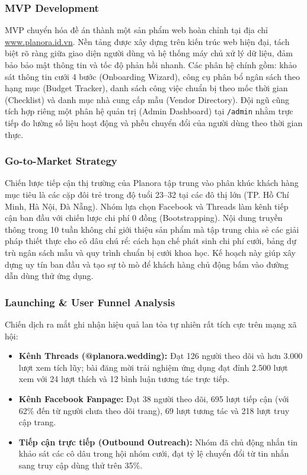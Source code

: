 \documentclass[11pt]{article}
\begin{document}
\subsubsection*{MVP Development}
MVP chuyển hóa đề án thành một sản phẩm web hoàn chỉnh tại địa chỉ \href{https://www.planora.id.vn}{www.planora.id.vn}. Nền tảng được xây dựng trên kiến trúc web hiện đại, tách biệt rõ ràng giữa giao diện người dùng và hệ thống máy chủ xử lý dữ liệu, đảm bảo bảo mật thông tin và tốc độ phản hồi nhanh. Các phân hệ chính gồm: khảo sát thông tin cưới 4 bước (Onboarding Wizard), công cụ phân bổ ngân sách theo hạng mục (Budget Tracker), danh sách công việc chuẩn bị theo mốc thời gian (Checklist) và danh mục nhà cung cấp mẫu (Vendor Directory). Đội ngũ cũng tích hợp riêng một phân hệ quản trị (Admin Dashboard) tại \texttt{/admin} nhằm trực tiếp đo lường số liệu hoạt động và phễu chuyển đổi của người dùng theo thời gian thực.

\subsubsection*{Go-to-Market Strategy}
Chiến lược tiếp cận thị trường của Planora tập trung vào phân khúc khách hàng mục tiêu là các cặp đôi trẻ trong độ tuổi 23--32 tại các đô thị lớn (TP. Hồ Chí Minh, Hà Nội, Đà Nẵng). Nhóm lựa chọn Facebook và Threads làm kênh tiếp cận ban đầu với chiến lược chi phí 0 đồng (Bootstrapping). Nội dung truyền thông trong 10 tuần không chỉ giới thiệu sản phẩm mà tập trung chia sẻ các giải pháp thiết thực cho cô dâu chú rể: cách hạn chế phát sinh chi phí cưới, bảng dự trù ngân sách mẫu và quy trình chuẩn bị cưới khoa học. Kế hoạch này giúp xây dựng uy tín ban đầu và tạo sự tò mò để khách hàng chủ động bấm vào đường dẫn dùng thử ứng dụng.

\subsubsection*{Launching \& User Funnel Analysis}
Chiến dịch ra mắt ghi nhận hiệu quả lan tỏa tự nhiên rất tích cực trên mạng xã hội:
\begin{itemize}
    \item \textbf{Kênh Threads (@planora.wedding):} Đạt 126 người theo dõi và hơn 3.000 lượt xem tích lũy; bài đăng mời trải nghiệm ứng dụng đạt đỉnh 2.500 lượt xem với 24 lượt thích và 12 bình luận tương tác trực tiếp.
    \item \textbf{Kênh Facebook Fanpage:} Đạt 38 người theo dõi, 695 lượt tiếp cận (với 62\% đến từ người chưa theo dõi trang), 69 lượt tương tác và 218 lượt truy cập trang.
    \item \textbf{Tiếp cận trực tiếp (Outbound Outreach):} Nhóm đã chủ động nhắn tin khảo sát các cô dâu trong hội nhóm cưới, đạt tỷ lệ chuyển đổi từ tin nhắn sang truy cập dùng thử trên 35\%.
\end{itemize}
\end{document}
